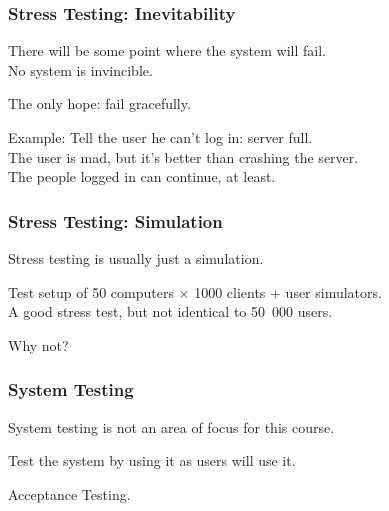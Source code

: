 \begin{frame}
\frametitle{Stress Testing: Inevitability}

\begin{changemargin}{1cm}
There will be some point where the system will fail.\\
\quad No system is invincible.

The only hope: fail gracefully.

Example: Tell the user he can't log in: server full.\\
\quad The user is mad, but it's better than crashing the server.\\
\quad The people logged in can continue, at least.


\end{changemargin}
\end{frame}


\begin{frame}
\frametitle{Stress Testing: Simulation}

\begin{changemargin}{1cm}

Stress testing is usually just a simulation.

Test setup of 50 computers $\times$ 1000 clients + user simulators.\\
\quad A good stress test, but not identical to 50~000 users.

Why not? 

\end{changemargin}
\end{frame}


\begin{frame}
\frametitle{System Testing}
\begin{changemargin}{1cm}
System testing is not an area of focus for this course.

Test the system by using it as users will use it.

Acceptance Testing.

\end{changemargin}
\end{frame}



